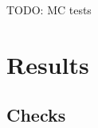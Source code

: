 \> TODO: MC tests


\chapter[results]{Results}

\section[results-checks]{Checks}

\> 





\EndText
\bye
